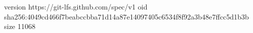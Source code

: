 version https://git-lfs.github.com/spec/v1
oid sha256:4049cd466f7beabccbba71d14a87e14097405c6534f8f92a3b48e7ffcc5d1b3b
size 11068

